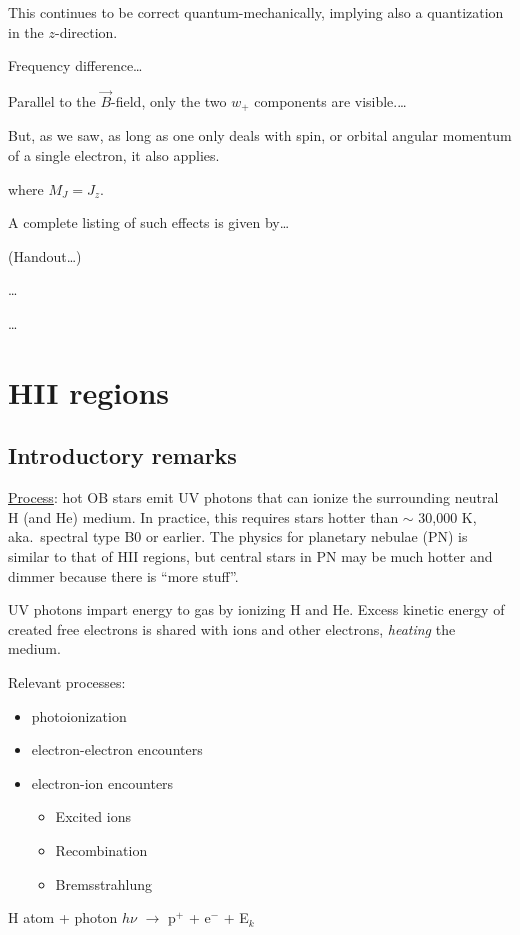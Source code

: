 \documentclass[11pt]{article}
\newcommand{\mar}[1]{\hspace{0pt}\marginpar{-\textcolor{black}{#1}-}}
\let\oldsection\section
\renewcommand\section{\clearpage\oldsection}
\begin{document}
\mar{I 21}This continues to be correct quantum-mechanically, implying
also a quantization in the $z$-direction.

\mar{I 22}Frequency difference\ldots

\mar{I 23}Parallel to the $\vec{B}$-field, only the two $w_{+}$ %
components are visible.\ldots

\mar{I 24}But, as we saw, as long as one only deals with spin, or orbital
angular momentum of a single electron, it also applies.

\mar{I 25}where $M_{J} = J_{z}$.

\mar{I 26}A complete listing of such effects is given by\ldots

\mar{I 27}(Handout\ldots)

\mar{I 28}\ldots

\mar{I 29}\ldots

\newpage
\section{HII regions}
\subsection{Introductory remarks}
\mar{51}\underline{Process}: hot OB stars emit UV photons that can ionize the
surrounding neutral H (and He) medium. In practice, this requires stars hotter
than $\sim$ 30,000 K, aka.\ spectral type B0 or earlier.
The physics for planetary nebulae (PN) is similar to that of HII regions,
but central stars in PN may be much hotter and dimmer
because there is ``more stuff''.

UV photons impart energy to gas by ionizing H and He. Excess kinetic energy
of created free electrons is shared with ions and other electrons,
\emph{heating} the medium.

Relevant processes:
\begin{itemize}
    \item photoionization
    \item electron-electron encounters
    \item electron-ion encounters
        \begin{itemize}
            \item Excited ions
            \item Recombination
            \item Bremsstrahlung
        \end{itemize}
\end{itemize}
H atom + photon $h\nu$ $\longrightarrow$ p$^{+}$ + e$^{-}$ + E$_{k}$
\end{document}
